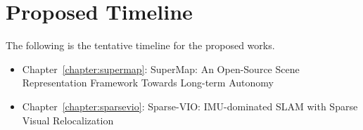 \chapter{Proposed Timeline}
\label{chapter:proposed_timeline}










The following is the tentative timeline for the proposed works. 

\begin{itemize}
    \item Chapter~\ref{chapter:supermap}: SuperMap:  An Open-Source Scene
    Representation Framework Towards
    Long-term Autonomy
    \item Chapter~\ref{chapter:sparsevio}:  Sparse-VIO: IMU-dominated
SLAM with Sparse Visual Relocalization
\end{itemize}

